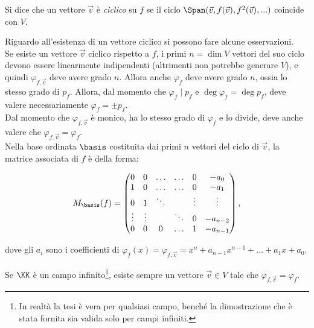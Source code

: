 \documentclass[11pt]{article}
\begin{document}
\begin{definition}
    Si dice che un vettore $\Vec{v}$ è \textit{ciclico} su $f$ se il ciclo
    $\Span(\vec{v}, f(\vec{v}), f^2(\Vec{v}), ...)$ coincide
    con $V$.
\end{definition}

\begin{remark}
    Riguardo all'esistenza di un vettore ciclico si possono
    fare alcune osservazioni. \\

    \li Se esiste un vettore $\vec{v}$ ciclico rispetto a $f$, i primi $n = \dim V$
    vettori del suo ciclo devono essere linearmente indipendenti
    (altrimenti non potrebbe generare $V$), e quindi $\varphi_{f,\Vec{v}}$ deve avere grado $n$. Allora
    anche $\varphi_f$ deve avere grado $n$, ossia lo stesso
    grado di $p_f$. Allora, dal momento che $\varphi_f \mid p_f$
    e $\deg \varphi_f = \deg p_f$, deve valere necessariamente
    $\varphi_f = \pm p_f$. \\
    \li Dal momento che $\varphi_{f,\Vec{v}}$ è monico, ha lo stesso grado
    di $\varphi_f$ e lo divide, deve anche valere che $\varphi_{f,\Vec{v}} = \varphi_f$. \\
    \li Nella base ordinata $\basis$ costituita dai primi $n$ vettori del ciclo di $\Vec{v}$, la matrice associata di $f$ è della forma:

    \[ M_{\basis}(f) =  \begin{pmatrix}
        0 & 0 & \ldots & \ldots & 0 & -a_0 \\
        1 & 0 & \ldots & \ldots & 0 & -a_1 \\
        0 & 1 & \ddots & & \vdots & \vdots \\
        \vdots & \vdots & & \ddots & 0 & -a_{n-2} \\
        0 & 0 & 0 & \ldots & 1 & -a_{n-1}
    \end{pmatrix}, \]

    dove gli $a_i$ sono i coefficienti di $\varphi_f(x) = \varphi_{f,\Vec{v}} = x^n + a_{n-1}x^{n-1} + \ldots + a_1 x + a_0$.
\end{remark}

\begin{proposition}
Se $\KK$ è un campo infinito\footnote{In realtà la tesi è vera per qualsiasi campo, benché la dimostrazione che è stata fornita sia valida solo per campi infiniti.}, esiste sempre un vettore $\vec{v} \in V$ tale che $\varphi_{f, \vec{v}} = \varphi_f$.
\end{proposition}
\end{document}
